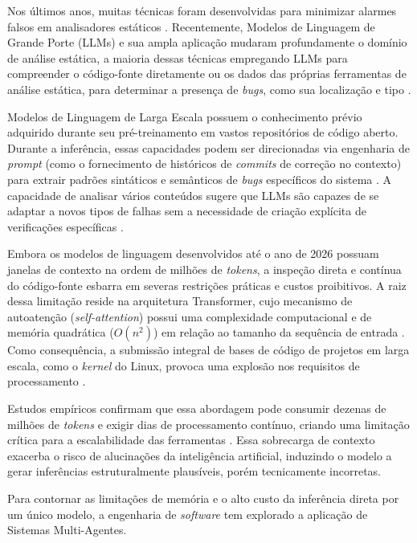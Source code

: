 \documentclass[
    12pt,                %
    openright,           %
    oneside,             %
    a4paper,             %
    english,             %
    brazil               %
]{abntex2}
\begin{document}
\begin{itemize}
\par
Nos últimos anos, muitas técnicas foram desenvolvidas para minimizar alarmes falsos em analisadores estáticos \cite{jiang2025factaligned}.
Recentemente, Modelos de Linguagem de Grande Porte (LLMs) e sua ampla aplicação mudaram profundamente o domínio de análise estática, a maioria dessas técnicas empregando LLMs para compreender o código-fonte diretamente ou os dados das próprias ferramentas de análise estática, para determinar a presença de \textit{bugs}, como sua localização e tipo \cite{hou2025generation}.
\par
Modelos de Linguagem de Larga Escala possuem o conhecimento prévio adquirido durante seu pré-treinamento em vastos repositórios de código aberto. 
Durante a inferência, essas capacidades podem ser direcionadas via engenharia de \textit{prompt} (como o fornecimento de históricos de \textit{commits} de correção no contexto) para extrair padrões sintáticos e semânticos de \textit{bugs} específicos do sistema \cite{tang2021grammar}. 
A capacidade de analisar vários conteúdos sugere que LLMs são capazes de se adaptar a novos tipos de falhas sem a necessidade de criação explícita de verificações específicas \cite{yang2025knighter}.
\par
Embora os modelos de linguagem desenvolvidos até o ano de 2026 possuam janelas de contexto na ordem de milhões de \textit{tokens}, a inspeção direta e contínua do código-fonte esbarra em severas restrições práticas e custos proibitivos.
A raiz dessa limitação reside na arquitetura Transformer, cujo mecanismo de autoatenção (\textit{self-attention}) possui uma complexidade computacional e de memória quadrática ($O(n^2)$) em relação ao tamanho da sequência de entrada \cite{vaswani2017attention}.
Como consequência, a submissão integral de bases de código de projetos em larga escala, como o \textit{kernel} do Linux, provoca uma explosão nos requisitos de processamento \cite{tunstall2022natural}.
\par 
Estudos empíricos confirmam que essa abordagem pode consumir dezenas de milhões de \textit{tokens} e exigir dias de processamento contínuo, criando uma limitação crítica para a escalabilidade das ferramentas \cite{hou2025generation}.
Essa sobrecarga de contexto exacerba o risco de alucinações da inteligência artificial, induzindo o modelo a gerar inferências estruturalmente plausíveis, porém tecnicamente incorretas.
\par
Para contornar as limitações de memória e o alto custo da inferência direta por um único modelo, a engenharia de \textit{software} tem explorado a aplicação de Sistemas Multi-Agentes.

\end{itemize}
\end{document}
